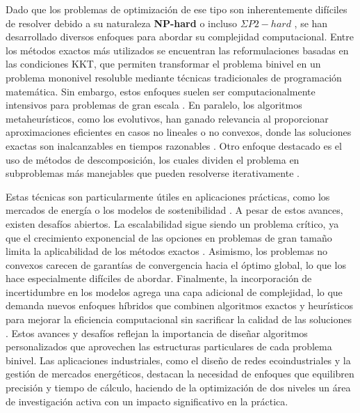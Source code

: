 Dado que los problemas de optimización de ese tipo son inherentemente difíciles de resolver debido a su naturaleza \textbf{NP-hard} \cite{Jeroslow1985ThePHNP,jonathan_f__bard_1991NP}
o incluso $\Sigma P2-hard$ \cite{phdthesisCerulli,DempeyZemkoho2020},
se han desarrollado diversos enfoques para abordar su complejidad computacional. Entre los métodos exactos más utilizados se encuentran las reformulaciones basadas en las condiciones KKT, que permiten transformar el problema binivel en un problema mononivel resoluble mediante técnicas tradicionales de programación matemática. Sin embargo, estos enfoques suelen ser computacionalmente intensivos para problemas de gran escala \cite{phdthesisCerulli}.
En paralelo, los algoritmos metaheurísticos, como los evolutivos, han ganado relevancia al proporcionar aproximaciones eficientes en casos no lineales o no convexos, donde las soluciones exactas son inalcanzables en tiempos razonables \cite{Sinha2017ARO}.
Otro enfoque destacado es el uso de métodos de descomposición, los cuales dividen el problema en subproblemas más manejables que pueden resolverse iterativamente \cite{Floudas1990ACO}.

Estas técnicas son particularmente útiles en aplicaciones prácticas, como los mercados de energía o los modelos de sostenibilidad \cite{SadddiquiNaturalGasSOS1}.
A pesar de estos avances, existen desafíos abiertos. La escalabilidad sigue siendo un problema crítico, ya que el crecimiento exponencial de las opciones en problemas de gran tamaño limita la aplicabilidad de los métodos exactos \cite{DempeyZemkoho2020}. Asimismo, los problemas no convexos carecen de garantías de convergencia hacia el óptimo global, lo que los hace especialmente difíciles de abordar. Finalmente, la incorporación de incertidumbre en los modelos agrega una capa adicional de complejidad, lo que demanda nuevos enfoques híbridos que combinen algoritmos exactos y heurísticos para mejorar la eficiencia computacional sin sacrificar la calidad de las soluciones \cite{phdthesisCerulli,Sinha2017ARO}. Estos avances y desafíos reflejan la importancia de diseñar algoritmos personalizados que aprovechen las estructuras particulares de cada problema binivel. Las aplicaciones industriales, como el diseño de redes ecoindustriales y la gestión de mercados energéticos, destacan la necesidad de enfoques que equilibren precisión y tiempo de cálculo, haciendo de la optimización de dos niveles un área de investigación activa con un impacto significativo en la práctica.


